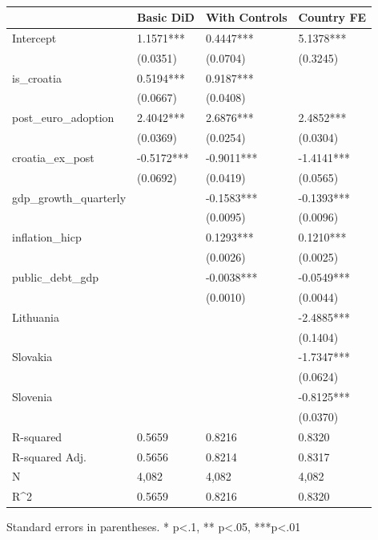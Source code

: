 \begin{table}
\caption{}
\label{}
\begin{center}
\begin{tabular}{llll}
\hline
                        & Basic DiD  & With Controls & Country FE  \\
\hline
Intercept               & 1.1571***  & 0.4447***     & 5.1378***   \\
                        & (0.0351)   & (0.0704)      & (0.3245)    \\
is\_croatia             & 0.5194***  & 0.9187***     &             \\
                        & (0.0667)   & (0.0408)      &             \\
post\_euro\_adoption    & 2.4042***  & 2.6876***     & 2.4852***   \\
                        & (0.0369)   & (0.0254)      & (0.0304)    \\
croatia\_ex\_post       & -0.5172*** & -0.9011***    & -1.4141***  \\
                        & (0.0692)   & (0.0419)      & (0.0565)    \\
gdp\_growth\_quarterly  &            & -0.1583***    & -0.1393***  \\
                        &            & (0.0095)      & (0.0096)    \\
inflation\_hicp         &            & 0.1293***     & 0.1210***   \\
                        &            & (0.0026)      & (0.0025)    \\
public\_debt\_gdp       &            & -0.0038***    & -0.0549***  \\
                        &            & (0.0010)      & (0.0044)    \\
Lithuania &            &               & -2.4885***  \\
                        &            &               & (0.1404)    \\
Slovakia  &            &               & -1.7347***  \\
                        &            &               & (0.0624)    \\
Slovenia  &            &               & -0.8125***  \\
                        &            &               & (0.0370)    \\
R-squared               & 0.5659     & 0.8216        & 0.8320      \\
R-squared Adj.          & 0.5656     & 0.8214        & 0.8317      \\
N                       & 4,082      & 4,082         & 4,082       \\
R^2                     & 0.5659     & 0.8216        & 0.8320      \\
\hline
\end{tabular}
\end{center}
\end{table}
\bigskip
Standard errors in parentheses. \newline 
* p<.1, ** p<.05, ***p<.01

